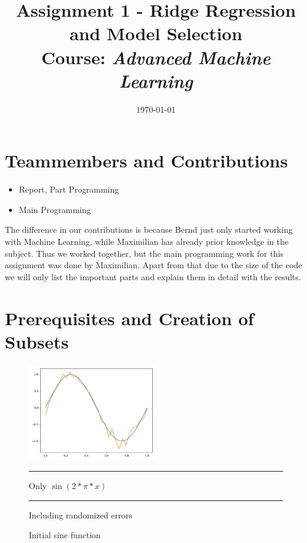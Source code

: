 \documentclass{article}
\title{Assignment 1 - Ridge Regression and Model Selection\\
		{\large Course: \textit{Advanced Machine Learning}}}
\date{\today}
\newcommand{\sqboxs}{1.2ex}%
\newcommand{\sqbox}[1]{\textcolor{#1}{\rule{\sqboxs}{\sqboxs}}}
\begin{document}
	\maketitle
	
	\section{Teammembers and Contributions}
	\begin{itemize}
		\item {} Report, Part Programming
		\item {} Main Programming
	\end{itemize}
	The difference in our contributions is because Bernd just only started working with Machine Learning, while Maximilian has already prior knowledge in the subject. Thus we worked together, but the main programming work for this assignment was done by Maximilian. Apart from that due to the size of the code we will only list the important parts and explain them in detail with the results. 
	
	\section{Prerequisites and Creation of Subsets} 
	\begin{figure} %
		\centering
		\includegraphics[width=0.5\textwidth]{plots/sine5.png}
		\caption{Initial sine function}
		\sqbox{clightblue} Only $\sin(2*\pi*x)$\\
		\sqbox{corange} Including randomized errors
		\label{plot:sine5}
	\end{figure}
	
\end{document}
